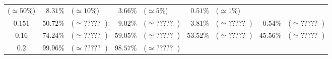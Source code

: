 \documentclass[10pt]{report}
\begin{document}
\begin{exercice}
\begin{center}
\begin{tabular}{|c|rl|rl|rl|rl|}
        ($\simeq 50\%$)
         & 
    
        $8.31\%$
         & 
    
        ($\simeq 10\%$)
         & 
    
        $3.66\%$
         & 
    
        ($\simeq 5\%$)
         & 
    
        $0.51\%$
         & 
    
        ($\simeq 1\%$)
        
    \\ 

    
        $0.151$
         & 
    
        $50.72\%$
         & 
    
        ($\simeq \mbox{ ????? }$)
         & 
    
        $9.02\%$
         & 
    
        ($\simeq \mbox{ ????? }$)
         & 
    
        $3.81\%$
         & 
    
        ($\simeq \mbox{ ????? }$)
         & 
    
        $0.54\%$
         & 
    
        ($\simeq \mbox{ ????? }$)
        
    \\ 

    
        $0.16$
         & 
    
        $74.24\%$
         & 
    
        ($\simeq \mbox{ ????? }$)
         & 
    
        $59.05\%$
         & 
    
        ($\simeq \mbox{ ????? }$)
         & 
    
        $53.52\%$
         & 
    
        ($\simeq \mbox{ ????? }$)
         & 
    
        $45.56\%$
         & 
    
        ($\simeq \mbox{ ????? }$)
        
    \\ 

    
        $0.2$
         & 
    
        $99.96\%$
         & 
    
        ($\simeq \mbox{ ????? }$)
         & 
    
        $98.57\%$
         & 
    
        ($\simeq \mbox{ ????? }$)
         & 
    

\end{tabular}
\end{center}
\end{exercice}
\end{document}
